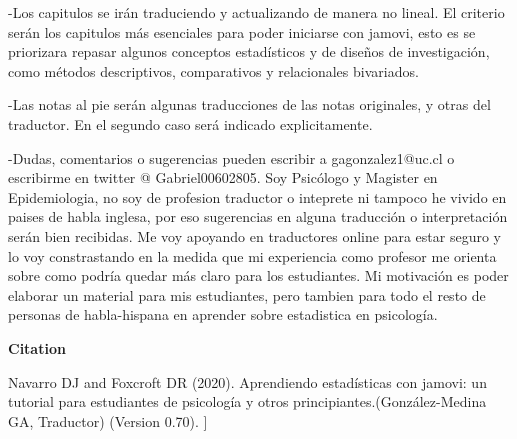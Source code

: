 -Los capitulos se irán traduciendo y actualizando de manera no lineal. El criterio serán los capitulos más esenciales para poder iniciarse con jamovi, esto es se priorizara repasar algunos conceptos estadísticos y de diseños de investigación, como métodos descriptivos, comparativos y relacionales bivariados.

-Las notas al pie serán algunas traducciones de las notas originales, y otras del traductor. En el segundo caso será indicado explicitamente.

-Dudas, comentarios o sugerencias pueden escribir a gagonzalez1@uc.cl o escribirme en twitter @ Gabriel00602805. Soy Psicólogo y Magister en Epidemiologia, no soy de profesion traductor o inteprete ni tampoco he vivido en paises de habla inglesa, por eso sugerencias en alguna traducción o interpretación serán bien recibidas. Me voy apoyando en traductores online para estar seguro y lo voy constrastando en la medida que mi experiencia como profesor me orienta sobre como podría quedar más claro para los estudiantes. Mi motivación es poder elaborar un material para mis estudiantes, pero tambien para todo el resto de personas de habla-hispana en aprender sobre estadistica en psicología.


\vspace{14cm}
\begin{center}
{\bf Citation}
\end{center}

\noindent
Navarro DJ and Foxcroft DR (2020). Aprendiendo estadísticas con jamovi: un tutorial para estudiantes de psicología y otros principiantes.(González-Medina GA, Traductor) (Version 0.70). ]
